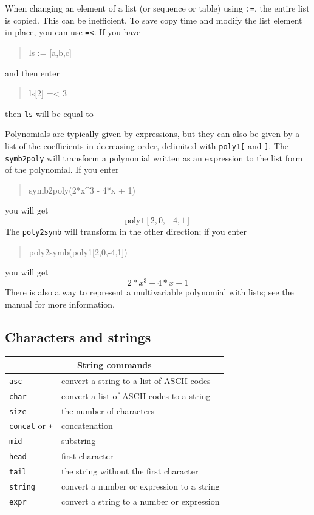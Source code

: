 \documentclass{article}
\newcommand{\xcasin}[1]
{\begin{quote}\ttfamily
#1
\end{quote}}
\newcommand{\xcasout}[1]
{\begin{equation*}
#1
\end{equation*}}
\begin{document}
When changing an element of a list (or sequence or table) using
\texttt{:=}, the entire list is copied.  This can be inefficient.  To
save copy time and modify the list element in place, you can use
\texttt{=<}.  If you have
\xcasin{ls := [a,b,c]}
and then enter
\xcasin{ls[2] =< 3}
then \texttt{ls} will be equal to
\xcasout{[a,b,3]}

Polynomials are typically given by expressions, but they can also be
given by a list of the coefficients in decreasing order, delimited
with \texttt{poly1[} and \texttt{]}.  The \texttt{symb2poly} will
transform a polynomial written as an expression to the list form of
the polynomial.  If you enter
\xcasin{symb2poly(2*x\^{}3 - 4*x + 1)}
you will get
\xcasout{\textrm{poly1}[2,0,-4,1]}
The \texttt{poly2symb} will transform in the other direction; if you
enter
\xcasin{poly2symb(poly1[2,0,-4,1])}
you will get
\xcasout{2*x^3 - 4*x + 1}
There is also a way to represent a multivariable polynomial with
lists; see the manual for more information.


\subsection{Characters and strings}

\begin{center}
\begin{tabular}{|p{}|p{}|}
\hline
\multicolumn{2}{|c|}{\textbf{String commands}}\\
\hline\hline
\texttt{asc} & convert a string to a list of ASCII codes \\
\texttt{char} & convert a list of ASCII codes to a string\\
\texttt{size} & the number of characters \\
\texttt{concat} or \texttt{+} & concatenation  \\
\texttt{mid}& substring\\
\texttt{head}& first character  \\
\texttt{tail}& the string without the first character\\
\texttt{string}& convert a number or expression to a string  \\
\texttt{expr}& convert a string to a number or expression \\
\hline
\end{tabular}
\end{center}
\end{document}
